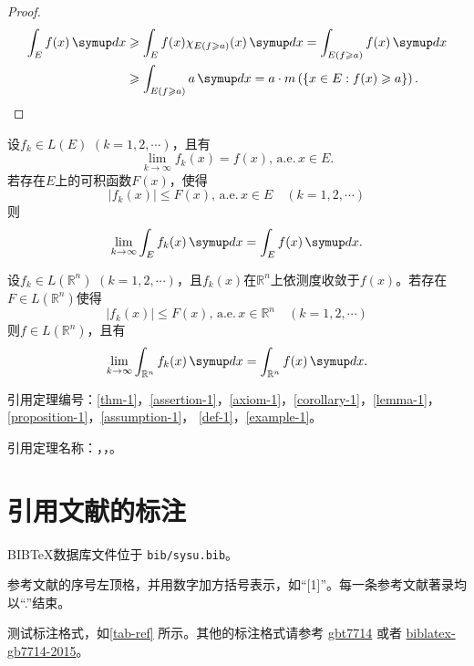 \begin{proof}
    \begin{align*}
        \int_E f(x)\diff x & \geqslant \int_E f(x)\chi_{E\left(f \geqslant a\right)}(x)\diff x = \int_{E\left(f \geqslant a\right)} f(x)\diff x             \\
                           & \geqslant \int_{E\left(f\geqslant a\right)} a\diff x = a\cdot m\left(\left\{x\in E : f(x) \geqslant a\right\}\right). \qedhere
    \end{align*}
\end{proof}

\begin{theorem}[控制收敛定理] \label{thm-1}
    设\(f_k\in L(E)\) \((k = 1,2,\cdots)\)，且有
    \[\lim_{k\to\infty}f_k(x) = f(x), \,\text{a.e.}\, x\in E.\]
    若存在\(E\)上的\textsf{可积}函数\(F(x)\)，使得
    \[\left\vert f_k(x)\right\vert\leqslant F(x),\,\text{a.e.}\, x\in E\quad (k = 1,2,\cdots)\]
    则
    \[\lim_{k\to\infty} \int_E f_k(x)\diff x = \int_E f(x)\diff x.\]
\end{theorem}

\begin{corollary}[依测度收敛型控制收敛定理] \label{corollary-1}
    设\(f_k\in L(\mathbb{R}^n)\) \((k = 1,2,\cdots)\)，且\(f_k(x)\)在\(\mathbb{R}^n\)上依测度收敛于\(f(x)\)。若存在\(F\in L(\mathbb{R}^n)\)使得
    \[\left\vert f_k(x)\right\vert \leqslant F(x),\,\text{a.e.}\, x\in\mathbb{R}^n \quad (k = 1,2,\cdots)\]
    则\(f\in L(\mathbb{R}^n)\)，且有
    \[\lim_{k\to\infty}\int_{\mathbb{R}^n} f_k(x)\diff x = \int_{\mathbb{R}^n} f(x)\diff x.\]
\end{corollary}

引用定理编号：\autoref{thm-1}，\autoref{assertion-1}，\autoref{axiom-1}，\autoref{corollary-1}，\autoref{lemma-1}，\autoref{proposition-1}，\autoref{assumption-1}， \autoref{def-1}，\autoref{example-1}。

引用定理名称：，，。

\section{引用文献的标注}

BIB\TeX 数据库文件位于 \verb|bib/sysu.bib|。

参考文献的序号左顶格，并用数字加方括号表示，如“[1]”。每一条参考文献著录均以“.”结束。

测试标注格式，如\autoref{tab-ref} 所示。其他的标注格式请参考 \href{http://mirrors.ctan.org/biblio/bibtex/contrib/gbt7714/gbt7714.pdf}{gbt7714} 或者
\href{http://mirrors.ctan.org/macros/latex/contrib/biblatex-contrib/biblatex-gb7714-2015/biblatex-gb7714-2015.pdf}{biblatex-gb7714-2015}。

